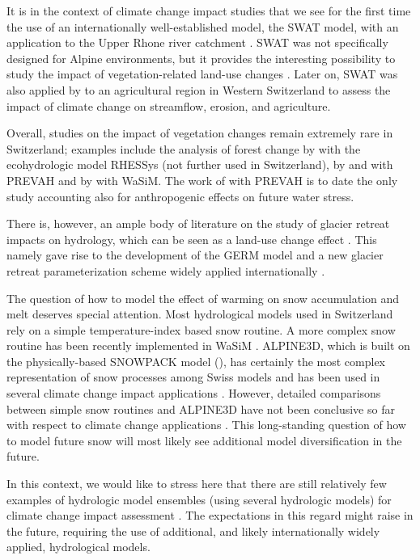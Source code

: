 \documentclass[10pt,a4paper]{article}
\begin{document}
It is in the context of climate change impact studies that we see for
the first time the use of an internationally well-established model, the
SWAT model, with an application to the Upper Rhone river
catchment \citep{Rahman2014}. SWAT was not specifically designed for
Alpine environments, but it provides the interesting possibility to
study the impact of vegetation-related land-use
changes \citep{Rahman2015}. Later on, SWAT was also applied
by \citet{Zarrineh2020} to an agricultural region in Western Switzerland
to assess the impact of climate change on streamflow, erosion, and
agriculture.

Overall, studies on the impact of vegetation changes remain extremely
rare in Switzerland; examples include the analysis of forest change
by \citet{zierl05} with the ecohydrologic model RHESSys (not further
used in Switzerland), by \citet{Koplin2013} and \citet{Schattan2013} with
PREVAH and by \citet{Alaoui2014} with WaSiM. The work
of \citet{Milano2015a} with PREVAH is to date the only study accounting
also for anthropogenic effects on future water stress. 

There is, however, an ample body of literature on the study of glacier
retreat impacts on hydrology, which can be seen as a land-use change
effect \citep{Horton2006,Schaefli2007b,Finger2015,Etter2017,Addor2014,Junghans2011}. 
This namely gave rise to the development of
the GERM model \citep{Huss2016,Junghans2011,Farinotti2012,Finger2013} 
and a new glacier retreat parameterization scheme widely applied
internationally \citep{Huss2010}.

The question of how to model the effect of warming on snow accumulation
and melt deserves special attention. Most hydrological models used in
Switzerland rely on a simple temperature-index based snow routine. A
more complex snow routine has been recently implemented in 
WaSiM \citep{Thornton2019}. ALPINE3D, which is built on the
physically-based SNOWPACK model (\citealt{Lehning2002,Bartelt_2002,Bartelt2002,Lehning_2002}), 
has certainly the most complex representation of snow processes among Swiss 
models and has been used in several climate change impact
applications \citep{Bavay2009,Bavay2013,Marty2017}. However, detailed comparisons between
simple snow routines and ALPINE3D have not been conclusive so far with
respect to climate change applications \citep{Kobierska2011,Shakoor2018}. This
long-standing question of how to model future snow will most likely see
additional model diversification in the future. 

In this context, we would like to stress here that there are still
relatively few examples of hydrologic model ensembles (using several
hydrologic models) for climate change impact
assessment \citep{Kobierska2011,Addor2014}. The expectations in this regard might
raise in the future, requiring the use of additional, and likely
internationally widely applied, hydrological models.
\end{document}
